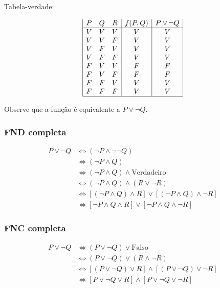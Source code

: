 Tabela-verdade:

\[
\begin{array}{|c c c|c| c|}
P & Q & R & f(P, Q) & P \lor \lnot Q\\ %
\hline %
V & V & V & V & V\\
V & V & F & V & V\\
V & F & V & V & V\\
V & F & F & V & V\\
F & V & V & F & F\\
F & V & F & F & F\\
F & F & V & V & V\\
F & F & F & V & V\\
\hline
\end{array}
\]

Observe que a função é equivalente a $P \lor \lnot Q$.

\subsubsection*{FND completa}
\begin{align*}
    P \lor \lnot Q
    &\Leftrightarrow (\lnot P \land \lnot \lnot Q)\\
    &\Leftrightarrow (\lnot P \land Q)\\
    &\Leftrightarrow (\lnot P \land Q) \land \text{Verdadeiro}\\
    &\Leftrightarrow (\lnot P \land Q) \land (R \lor \lnot R)\\
    &\Leftrightarrow [(\lnot P \land Q) \land R] \lor [(\lnot P \land Q) \land \lnot R]\\
    &\Leftrightarrow [\lnot P \land Q \land R] \lor [\lnot P \land Q \land \lnot R]
\end{align*}

\subsubsection*{FNC completa}
\begin{align*}
    P \lor \lnot Q
    &\Leftrightarrow (P \lor \lnot Q) \lor \text{Falso}\\
    &\Leftrightarrow (P \lor \lnot Q) \lor (R \land \lnot R)\\
    &\Leftrightarrow [(P \lor \lnot Q) \lor R] \land [(P \lor \lnot Q) \lor \lnot R]\\
    &\Leftrightarrow [P \lor \lnot Q \lor R] \land [P \lor \lnot Q \lor \lnot R]
\end{align*}